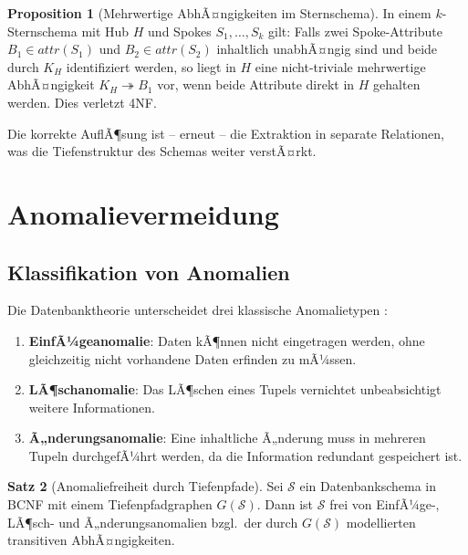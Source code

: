 ﻿\documentclass[12pt,a4paper]{article}
\theoremstyle{definition}
\newtheorem{theorem}{Satz}[section]
\newtheorem{proposition}[theorem]{Proposition}
\theoremstyle{remark}
\newcommand{\att}{\mathit{attr}}
\begin{document}
\begin{proposition}[Mehrwertige AbhÃ¤ngigkeiten im Sternschema]
\label{prop:mvd_stern}
In einem $k$-Sternschema mit Hub $H$ und Spokes $S_1, \ldots, S_k$ gilt:
Falls zwei Spoke-Attribute $B_1 \in \att(S_1)$ und $B_2 \in \att(S_2)$
inhaltlich unabhÃ¤ngig sind und beide durch $K_H$ identifiziert werden, so
liegt in $H$ eine nicht-triviale mehrwertige AbhÃ¤ngigkeit $K_H \twoheadrightarrow B_1$
vor, wenn beide Attribute direkt in $H$ gehalten werden. Dies verletzt 4NF.
\end{proposition}

Die korrekte AuflÃ¶sung ist -- erneut -- die Extraktion in separate Relationen,
was die Tiefenstruktur des Schemas weiter verstÃ¤rkt.

\section{Anomalievermeidung}
\label{sec:anomalien}

\subsection{Klassifikation von Anomalien}

Die Datenbanktheorie unterscheidet drei klassische Anomalietypen \cite{Date2003}:

\begin{enumerate}[label=(\roman*)]
  \item \textbf{EinfÃ¼geanomalie}: Daten kÃ¶nnen nicht eingetragen werden,
        ohne gleichzeitig nicht vorhandene Daten erfinden zu mÃ¼ssen.
  \item \textbf{LÃ¶schanomalie}: Das LÃ¶schen eines Tupels vernichtet
        unbeabsichtigt weitere Informationen.
  \item \textbf{Ã„nderungsanomalie}: Eine inhaltliche Ã„nderung muss in
        mehreren Tupeln durchgefÃ¼hrt werden, da die Information redundant gespeichert ist.
\end{enumerate}

\begin{theorem}[Anomaliefreiheit durch Tiefenpfade]
\label{thm:anomaliefrei}
Sei $\mathcal{S}$ ein Datenbankschema in BCNF mit einem Tiefenpfadgraphen
$G(\mathcal{S})$. Dann ist $\mathcal{S}$ frei von EinfÃ¼ge-, LÃ¶sch- und
Ã„nderungsanomalien bzgl.\ der durch $G(\mathcal{S})$ modellierten
transitiven AbhÃ¤ngigkeiten.
\end{theorem}
\end{document}
